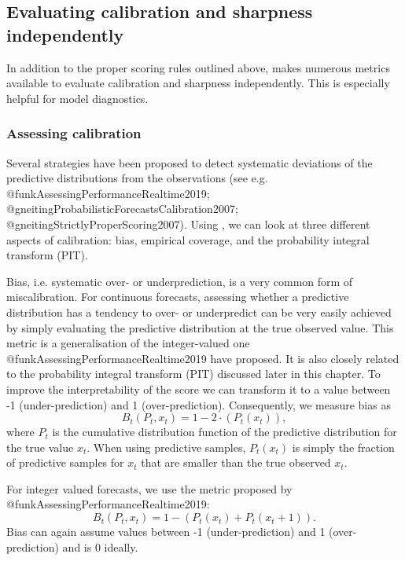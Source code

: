 \documentclass[article]{jss}
\begin{document}
\subsection{Evaluating calibration and sharpness independently}

In addition to the proper scoring rules outlined above,  makes numerous metrics available to evaluate calibration and sharpness independently. This is especially helpful for model diagnostics. 

\subsubsection{Assessing calibration} 

Several strategies have been proposed to detect systematic deviations of the predictive distributions from the observations (see e.g. @funkAssessingPerformanceRealtime2019; @gneitingProbabilisticForecastsCalibration2007; @gneitingStrictlyProperScoring2007). Using , we can look at three different aspects of calibration: bias, empirical coverage, and the probability integral transform (PIT). 

Bias, i.e. systematic over- or underprediction, is a very common form of miscalibration. For continuous forecasts, assessing whether a predictive distribution has a tendency to over- or underpredict can be very easily achieved by simply evaluating the predictive distribution at the true observed value. This metric is a generalisation of the integer-valued one @funkAssessingPerformanceRealtime2019 have proposed. It is also closely related to the probability integral transform (PIT) discussed later in this chapter. To improve the interpretability of the score we can transform it to a value between -1 (under-prediction) and 1 (over-prediction). Consequently, we measure bias as
$$B_t (P_t, x_t) = 1 - 2 \cdot (P_t (x_t)),$$
where $P_t$ is the cumulative distribution function of the predictive distribution for the true value $x_t$. When using predictive samples, $P_t (x_t)$ is simply the fraction of predictive samples for $x_t$ that are smaller than the true observed $x_t$.

For integer valued forecasts, we use the metric proposed by @funkAssessingPerformanceRealtime2019: 
$$B_t (P_t, x_t) = 1 - (P_t (x_t) + P_t (x_t + 1)).$$
Bias can again assume values between -1 (under-prediction) and 1 (over-prediction) and is 0 ideally. 
\end{document}
